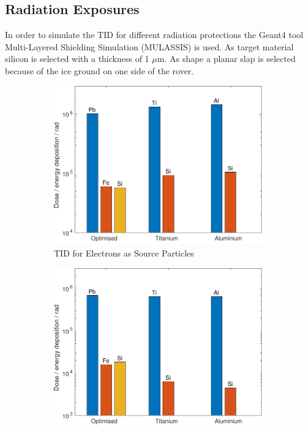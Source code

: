 \clearpage

\subsection{Radiation Exposures}

\label{subsec:AppendixRadiationExposures}

In order to simulate the TID for different radiation protections the Geant4 tool Multi-Layered Shielding Simulation (MULASSIS) is used. As target material silicon is selected with a thickness of 1 \(\mu \text{m}\). As shape a planar slap is selected because of the ice ground on one side of the rover.

\begin{figure}[htb]
     \centering
     \begin{subfigure}[b]{0.49\textwidth}
         \centering
         \includegraphics[width=\textwidth]{Media/J_Electron_Shielding}
         \caption{TID for Electrons as Source Particles}
         \label{fig:TIDElectronShielding}
     \end{subfigure}
     \hfill
     \begin{subfigure}[b]{0.49\textwidth}
         \centering
         \includegraphics[width=\textwidth]{Media/J_Proton_Shielding}

\end{subfigure}
\end{figure}
